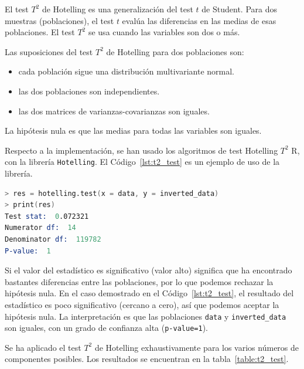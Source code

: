 \documentclass[11pt,spanish,listoffigures,listoftables]{tfgetsinf}
\begin{document}
    El test \(T^2\) de Hotelling es una generalización del test \(t\) de Student. Para dos muestras (poblaciones), el test \(t\) evalúa las diferencias en las medias de esas poblaciones. El test \(T^2\) se usa cuando las variables son dos o más.

    Las suposiciones del test \(T^2\) de Hotelling para dos poblaciones son:
    \begin{itemize}
    \item cada población sigue una distribución multivariante normal.
    \item las dos poblaciones son independientes.
    \item las dos matrices de varianzas-covarianzas son iguales.
    \end{itemize}
    
    La hipótesis nula es que las medias para todas las variables son iguales. 
    
    Respecto a la implementación, se han usado los algoritmos de test Hotelling \(T^2\) R, con la librería {\tt Hotelling}. El Código~\ref{lst:t2_test} es un ejemplo de uso de la librería.

    \begin{lstlisting}[language=S, caption=Test \(T^2\) de Hotelling en R., label={lst:t2_test}]
> res = hotelling.test(x = data, y = inverted_data)
> print(res)
Test stat:  0.072321 
Numerator df:  14 
Denominator df:  119782 
P-value:  1
    \end{lstlisting}
    
    Si el valor del estadístico es significativo (valor alto) significa que ha encontrado bastantes diferencias entre las poblaciones, por lo que podemos rechazar la hipótesis nula. En el caso demostrado en el Código~\ref{lst:t2_test}, el resultado del estadístico es poco significativo (cercano a cero), así que podemos aceptar la hipótesis nula. La interpretación es que las poblaciones {\tt data} y {\tt inverted\_data} son iguales, con un grado de confianza alta ({\tt p-value=1}). 
    
    Se ha aplicado el test \(T^2\) de Hotelling exhaustivamente para los varios números de componentes posibles. Los resultados se encuentran en la tabla~\ref{table:t2_test}.
    
\end{document}
